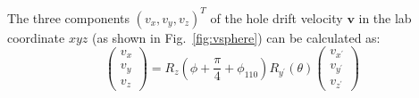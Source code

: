 The three components $(v_{x}, v_{y}, v_{z})^{T}$ of the hole drift velocity $\mathbf{v}$ in the lab coordinate $xyz$ (as shown in Fig.~\ref{fig:vsphere}) can be calculated as:
\begin{equation}
  \label{eq:v2v}  
  \left(
    \begin{array}{c}
      v_{x} \\ v_{y} \\ v_{z}
    \end{array}
\right) = R_{z}(\phi + \frac{\pi}{4} + \phi_{110}) R_{y^{\prime}}(\theta) \left( 
    \begin{array}{c}
      v_{x^{\prime}} \\ v_{y^{\prime}} \\ v_{z^{\prime}}
    \end{array} \right)
\end{equation}

